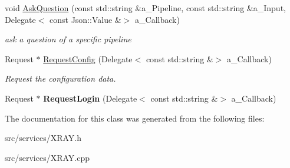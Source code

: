\begin{DoxyCompactItemize}
void \hyperlink{class_x_r_a_y_a44a3a604628f62cf0470c861242bc892}{Ask\+Question} (const std\+::string \&a\+\_\+\+Pipeline, const std\+::string \&a\+\_\+\+Input, Delegate$<$ const Json\+::\+Value \&$>$ a\+\_\+\+Callback)
\begin{DoxyCompactList}\small\item\em ask a question of a specific pipeline \end{DoxyCompactList}\item 
\mbox{\label{class_x_r_a_y_a4e5e4f76ca464569b87d121e04e13320}} 
Request $\ast$ \hyperlink{class_x_r_a_y_a4e5e4f76ca464569b87d121e04e13320}{Request\+Config} (Delegate$<$ const std\+::string \&$>$ a\+\_\+\+Callback)
\begin{DoxyCompactList}\small\item\em Request the configuration data. \end{DoxyCompactList}\item 
\mbox{\label{class_x_r_a_y_a4c48e18073e3d281013be5ebfd85e461}} 
Request $\ast$ {\bfseries Request\+Login} (Delegate$<$ const std\+::string \&$>$ a\+\_\+\+Callback)
\end{DoxyCompactItemize}


The documentation for this class was generated from the following files\+:\begin{DoxyCompactItemize}
\item 
src/services/X\+R\+A\+Y.\+h\item 
src/services/X\+R\+A\+Y.\+cpp\end{DoxyCompactItemize}
